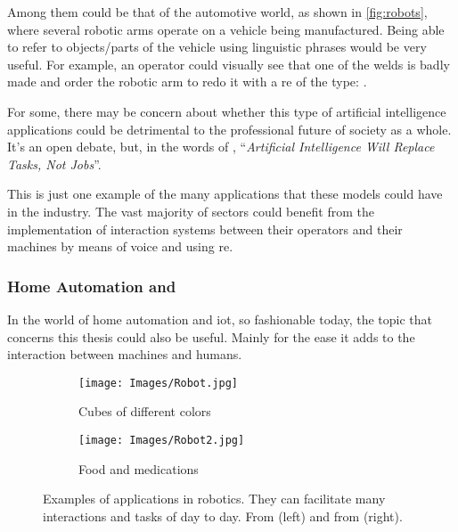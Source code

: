 Among them could be that of the automotive world, as shown in
\vref{fig:robots}, where several robotic arms operate on a vehicle being
manufactured. Being able to refer to objects/parts of the vehicle using
linguistic phrases would be very useful. For example, an operator could
visually see that one of the welds is badly made and order the robotic arm to
redo it with a \gls{re} of the type: .

\begin{remarkBox}
  For some, there may be concern about whether this type of artificial
  intelligence applications could be detrimental to the professional future of
  society as a whole. It's an open debate, but, in the words of
  \citeauthor*{contributor18:artif_intel_will_replac_tasks_not_jobs}
  \cite{contributor18:artif_intel_will_replac_tasks_not_jobs},
  ``\textit{Artificial Intelligence Will Replace Tasks, Not Jobs}''.
\end{remarkBox}

This is just one example of the many applications that these models could have
in the industry. The vast majority of sectors could benefit from the
implementation of interaction systems between their operators and their
machines by means of voice and using \gls{re}.

\subsubsection{Home Automation and }

In the world of home automation and \gls{iot}, so fashionable today, the topic
that concerns this thesis could also be useful. Mainly for the ease it adds to
the interaction between machines and humans.

\begin{figure}[ht]
  \centering
  \begin{subfigure}[t]{.55\textwidth}
    \centering
    \caption{Cubes of different colors}
    \texttt{[image: Images/Robot.jpg]}
  \end{subfigure}\hfill
  \begin{subfigure}[t]{.4\textwidth}
    \centering
    \caption{Food and medications}
    \texttt{[image: Images/Robot2.jpg]}
  \end{subfigure}
  \caption[Examples of applications in robotics]{Examples of applications in
    robotics. They can facilitate many interactions and tasks of day to
    day. From  (left) and from
     (right).}\label{fig:robot}
\end{figure}


